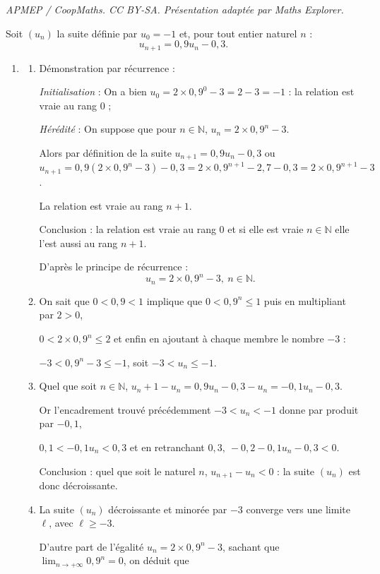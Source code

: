 \documentclass[10pt]{article}
\providecommand{\N}{\mathbb{N}}
\begin{document}
\noindent\textit{APMEP / CoopMaths. CC BY-SA. Présentation adaptée par Maths Explorer.}\par\medskip
\medskip

Soit $\left(u_n\right)$ la suite définie par $u_0 = - 1$ et, pour tout entier naturel $n$ :
\[u_{n+1} = 0,9u_n - 0,3.\]

\begin{enumerate}
\item 
	\begin{enumerate}
		\item Démonstration par récurrence :
		
\emph{Initialisation} : On a bien $u_0 = 2 \times 0,9^0 - 3 = 2 - 3 = - 1$ : la relation est vraie au rang $0$ ;
		
\emph{Hérédité} : On suppose que pour $n \in \N$, \: $u_n  = 2 \times 0,9^n - 3$. 

Alors par définition de la suite $u_{n+1} = 0,9u_n - 0,3$ ou $u_{n+1} = 0,9\left(2 \times 0,9^n - 3\right) - 0,3 = 2 \times 0,9^{n+1} - 2,7 - 0,3 = 2 \times 0,9^{n+1} - 3$.

La relation est vraie au rang $n + 1$.

Conclusion : la relation est vraie au rang 0 et si elle est vraie $n \in \N$ elle l'est aussi au rang $n + 1$.

D'après le principe de récurrence :
\[u_n  = 2 \times 0,9^n - 3, \:	n \in \N.\]
\item On sait que $0 < 0,9 < 1$ implique que $0 < 0,9^n \leqslant 1$ puis en multipliant par $2 > 0$,

$0 < 2 \times 0,9^n \leqslant 2$ et enfin  en ajoutant à chaque membre le nombre $- 3$ :

$- 3 < 0,9^n - 3 \leqslant - 1$, soit $- 3 < u_n \leqslant - 1$.
		\item Quel que soit $n \in \N$, \: $u_n+1 - u_n = 0,9u_n - 0,3 - u_n = - 0,1u_n - 0,3$.
		
Or l'encadrement trouvé précédemment $- 3 < u_n < - 1$ donne par produit par $- 0,1$, 
		
$ 0,1 < - 0,1u_n < 0,3$ et en retranchant $0,3, \: -0,2 - 0,1u_n - 0,3  < 0$.
		
Conclusion : quel que soit le naturel $n$, \: $u_{n+1} - u_n < 0$ : la suite $\left(u_n\right)$ est donc décroissante.
		\item 	La suite $\left(u_n\right)$ décroissante et minorée par $-3$ converge vers une limite $\ell$, avec $\ell\geqslant - 3$.
		
D'autre part de l'égalité $u_n  = 2 \times 0,9^n - 3$, sachant que $\displaystyle\lim_{n \to + \infty} 0,9^n = 0$, on déduit que 


\end{enumerate}
\end{enumerate}
\end{document}
